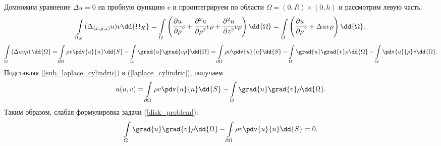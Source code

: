 Домножим уравнение $\Delta u = 0$ на пробную функцию $v$ и проинтегрируем по области $\Omega = (0,R)\times(0,h)$ и рассмотрим левую часть:
\begin{equation}\label{laplace_cylindric}
	\int\limits_{\Omega_{X}} (\Delta_{(x,y,z)} u) v \dd{\Omega_{X}} = \int\limits_{\Omega} \left( \cfrac{\partial u}{\partial \rho}v + \cfrac{\partial^2u}{\partial \rho^2}v\rho + \cfrac{\partial^2u}{\partial z^2}v\rho \right) \dd{\Omega} = \int\limits_{\Omega} \left( \cfrac{\partial u}{\partial \rho}v + \Delta u v\rho \right) \dd{\Omega}.
\end{equation}
\begin{equation}\label{sub_laplace_cylindric}
	\int\limits_{\Omega} \left( \Delta u v\rho \right) \dd{\Omega} = \int\limits_{\partial \Omega}\rho v \pdv{u}{n}\dd{S}-\int\limits_{\Omega}\grad{u}\grad{v\rho}\dd{\Omega}=\int\limits_{\partial \Omega}\rho v \pdv{u}{n}\dd{S}-\int\limits_{\Omega}\grad{u}\grad{v}\rho\dd{\Omega}-\int\limits_{\Omega}\pdv{u}{\rho}v\dd{\Omega}.
\end{equation}
Подставляя (\ref{sub_laplace_cylindric}) в (\ref{laplace_cylindric}), получаем
\begin{equation}
	a(u,v)=\int\limits_{\partial \Omega}\rho v \pdv{u}{n}\dd{S}-\int\limits_{\Omega}\grad{u}\grad{v}\rho\dd{\Omega}.
\end{equation}
Таким образом, слабая формулировка задачи (\ref{disk_problem}):
\begin{equation}\label{disk_weak}
	\int\limits_{\Omega}\grad{u}\grad{v}\rho\dd{\Omega}-\int\limits_{\partial \Omega}\rho v \pdv{u}{n}\dd{S}=0.
\end{equation}
